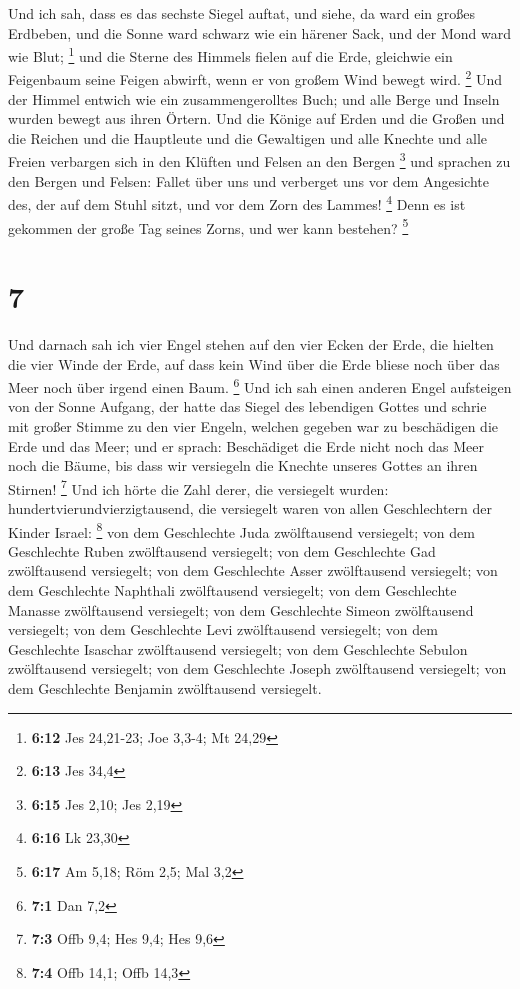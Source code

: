  Und ich sah, dass es das sechste Siegel auftat, und siehe,
da ward ein großes Erdbeben, und die Sonne ward schwarz wie ein härener
Sack, und der Mond ward wie Blut; \footnote{\textbf{6:12} Jes 24,21-23;
  Joe 3,3-4; Mt 24,29}  und die Sterne des Himmels fielen
auf die Erde, gleichwie ein Feigenbaum seine Feigen abwirft, wenn er von
großem Wind bewegt wird. \footnote{\textbf{6:13} Jes 34,4} 
Und der Himmel entwich wie ein zusammengerolltes Buch; und alle Berge
und Inseln wurden bewegt aus ihren Örtern.  Und die Könige
auf Erden und die Großen und die Reichen und die Hauptleute und die
Gewaltigen und alle Knechte und alle Freien verbargen sich in den
Klüften und Felsen an den Bergen \footnote{\textbf{6:15} Jes 2,10; Jes
  2,19}  und sprachen zu den Bergen und Felsen: Fallet über
uns und verberget uns vor dem Angesichte des, der auf dem Stuhl sitzt,
und vor dem Zorn des Lammes! \footnote{\textbf{6:16} Lk 23,30}
 Denn es ist gekommen der große Tag seines Zorns, und wer
kann bestehen? \footnote{\textbf{6:17} Am 5,18; Röm 2,5; Mal 3,2}

\hypertarget{section-1}{%
\section{7}\label{section-1}}

 Und darnach sah ich vier Engel stehen auf den vier Ecken
der Erde, die hielten die vier Winde der Erde, auf dass kein Wind über
die Erde bliese noch über das Meer noch über irgend einen Baum.
\footnote{\textbf{7:1} Dan 7,2}  Und ich sah einen anderen
Engel aufsteigen von der Sonne Aufgang, der hatte das Siegel des
lebendigen Gottes und schrie mit großer Stimme zu den vier Engeln,
welchen gegeben war zu beschädigen die Erde und das Meer; 
und er sprach: Beschädiget die Erde nicht noch das Meer noch die Bäume,
bis dass wir versiegeln die Knechte unseres Gottes an ihren Stirnen!
\footnote{\textbf{7:3} Offb 9,4; Hes 9,4; Hes 9,6}  Und ich
hörte die Zahl derer, die versiegelt wurden:
hundertvierundvierzigtausend, die versiegelt waren von allen
Geschlechtern der Kinder Israel: \footnote{\textbf{7:4} Offb 14,1; Offb
  14,3}  von dem Geschlechte Juda zwölftausend versiegelt;
von dem Geschlechte Ruben zwölftausend versiegelt; von dem Geschlechte
Gad zwölftausend versiegelt;  von dem Geschlechte Asser
zwölftausend versiegelt; von dem Geschlechte Naphthali zwölftausend
versiegelt; von dem Geschlechte Manasse zwölftausend versiegelt;
 von dem Geschlechte Simeon zwölftausend versiegelt; von dem
Geschlechte Levi zwölftausend versiegelt; von dem Geschlechte Isaschar
zwölftausend versiegelt;  von dem Geschlechte Sebulon
zwölftausend versiegelt; von dem Geschlechte Joseph zwölftausend
versiegelt; von dem Geschlechte Benjamin zwölftausend versiegelt.

